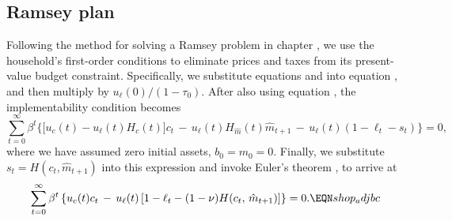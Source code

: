 \subsection{Ramsey plan}
Following the method for solving a Ramsey problem in chapter
, we use the household's first-order conditions to
eliminate prices and taxes from its present-value budget
constraint. Specifically, we substitute equations 
and  into equation , and then
multiply by $u_\ell (0)/(1-\tau_0)$. After also using equation
, the implementability condition becomes
$$
\sum_{t=0}^\infty \beta^t \bigl\{ \bigl[ u_c(t) - u_{\ell}(t) H_c(t)\bigr]
c_t \,-\, u_\ell(t)  H_{\hat m}(t) \hat m_{t+1}
\,-\, u_\ell(t) (1 - \ell_t -s_t) \bigr\} = 0,
$$%
where we have assumed zero initial assets, $b_0 = m_0 = 0$.
Finally, we substitute $s_t = H(c_t, \hat m_{t+1})$ into this
expression and invoke Euler's theorem , to arrive at
$$
\sum_{t=0}^{\infty} \beta^t \left\{ u_c(t) c_t
\,-\, u_{\ell}(t) \left[ 1 - \ell_t - (1-\nu) H(c_t,\, \hat m_{t+1})  \right]
                                                    \right\} = 0.  \EQN shop_adjbc
$$


